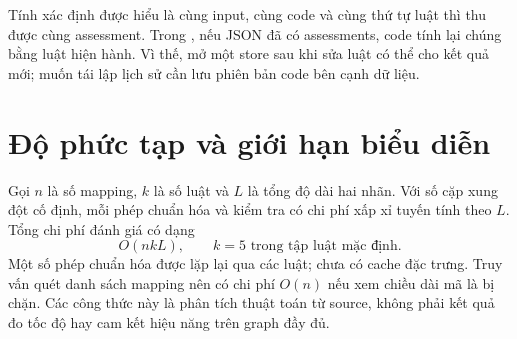 Tính xác định được hiểu là cùng input, cùng code và cùng thứ tự luật thì
thu được cùng assessment. Trong , nếu JSON đã
có assessments, code tính lại chúng bằng luật hiện hành.
Vì thế, mở một store sau khi sửa luật có thể cho kết quả mới; muốn tái lập
lịch sử cần lưu phiên bản code bên cạnh dữ liệu.

\section{Độ phức tạp và giới hạn biểu diễn}
Gọi $n$ là số mapping, $k$ là số luật và $L$ là tổng độ dài hai nhãn.
Với số cặp xung đột cố định, mỗi phép chuẩn hóa và kiểm tra có chi phí
xấp xỉ tuyến tính theo $L$. Tổng chi phí đánh giá có dạng
\begin{equation}
  O(nkL),\qquad k=5 \text{ trong tập luật mặc định}.
\end{equation}
Một số phép chuẩn hóa được lặp lại qua các luật; chưa có cache đặc trưng.
Truy vấn  quét danh sách mapping nên có chi phí
$O(n)$ nếu xem chiều dài mã là bị chặn.
Các công thức này là phân tích thuật toán từ source, không phải kết quả
đo tốc độ hay cam kết hiệu năng trên graph đầy đủ.
